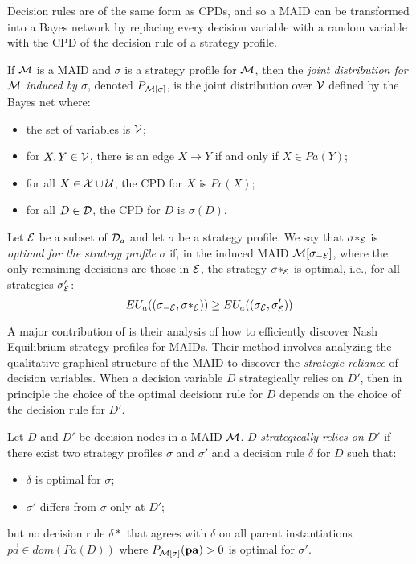 \documentclass[../thesis.tex]{subfiles}
\begin{document}
Decision rules are of the same form as CPDs, and so a MAID
can be transformed into a Bayes network by replacing every
decision variable with a random variable with the CPD of the
decision rule of a strategy profile.

\begin{dfn}
  If $\mathcal{M}$ is a MAID and $\sigma$ is a strategy profile for
  $\mathcal{M}$, then the \emph{joint distribution for $\mathcal{M}$
    induced by $\sigma$}, denoted $P_{\mathcal{M}[\sigma]}$, is the
  joint distribution over $\mathcal{V}$ defined by the Bayes
  net where:
  \begin{itemize}
  \item the set of variables is $\mathcal{V}$;
  \item for $X, Y \in \mathcal{V}$, there is an edge $X \rightarrow Y$
    if and only if $X \in Pa(Y)$;
  \item for all $X \in \mathcal{X} \cup \mathcal{U}$, the CPD for $X$ is $Pr(X)$;
  \item for all $D \in \mathcal{D}$, the CPD for $D$ is $\sigma(D)$.
  \end{itemize}
\end{dfn}

\begin{dfn}
  Let $\mathcal{E}$ be a subset of $\mathcal{D}_a$ and let $\sigma$ be a strategy
  profile.
  We say that $\sigma*_\mathcal{E}$ is \emph{optimal for the strategy profile}
  $\sigma$ if, in the induced MAID $\mathcal{M}[\sigma_{-\mathcal{E}}]$,
  where the only remaining decisions are those in $\mathcal{E}$,
  the strategy $\sigma*_{\mathcal{E}}$ is optimal, i.e., for all
  strategies $\sigma'_{\mathcal{E}}$:
  $$EU_a((\sigma_{-\mathcal{E}},\sigma*_{\mathcal{E}})) \geq EU_a((\sigma_{\mathcal{E}}, \sigma'_{\mathcal{E}}))$$
\end{dfn}

A major contribution of \citet{koller2003multi} is their analysis
of how to efficiently discover Nash Equilibrium strategy profiles
for MAIDs.
Their method involves analyzing the qualitative graphical
structure of the MAID to discover the \emph{strategic reliance}
of decision variables.
When a decision variable $D$ strategically relies on $D'$,
then in principle the choice of the optimal decisionr rule for
$D$ depends on the choice of the decision rule for $D'$.

\begin{dfn}
  \label{dfn:strategic-reliance}
  Let $D$ and $D'$ be decision nodes in a MAID $\mathcal{M}$.
  $D$ \emph{strategically relies on} $D'$ if there exist
  two strategy profiles $\sigma$ and $\sigma'$ and a
  decision rule $\delta$ for $D$ such that:
  \begin{itemize}
  \item $\delta$ is optimal for $\sigma$;
  \item $\sigma'$ differs from $\sigma$ only at $D'$;
  \end{itemize}
  but no decision rule $\delta*$ that agrees with $\delta$ on
  all parent instantiations $\vec{pa} \in dom(Pa(D))$
  where $P_{\mathcal{M}[\sigma]}(\mathbf{pa}) > 0$ is optimal for $\sigma'$.
\end{dfn}
\end{document}
